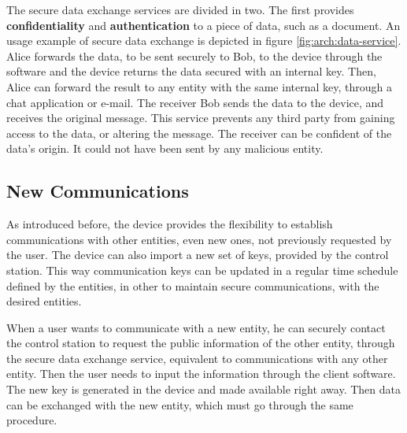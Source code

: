 The secure data exchange services are divided in two. The first provides \textbf{confidentiality} and \textbf{authentication} to a piece of data, such as a document.
An usage example of secure data exchange is depicted in figure \ref{fig:arch:data-service}. Alice forwards the data, to be sent securely to Bob, to the device through the software and the device returns the data secured with an internal key. Then, Alice can forward the result to any entity with the same internal key, through a chat application or e-mail.
The receiver Bob sends the data to the device, and receives the original message.
This service prevents any third party from gaining access to the data, or altering the message. The receiver can be confident of the data's origin. It could not have been sent by any malicious entity.


\subsection{New Communications}\label{chap:arch:ops:new}

As introduced before, the device provides the flexibility to establish communications with other entities, even new ones, not previously requested by the user.
The device can also import a new set of keys, provided by the control station.
This way communication keys can be updated in a regular time schedule defined by the entities, in other to maintain secure communications, with the desired entities.

When a user wants to communicate with a new entity, he can securely contact the control station to request the public information of the other entity, through the secure data exchange service, equivalent to communications with any other entity.
Then the user needs to input the information through the client software. The new key is generated in the device and made available right away. Then data can be exchanged with the new entity, which must go through the same procedure.

